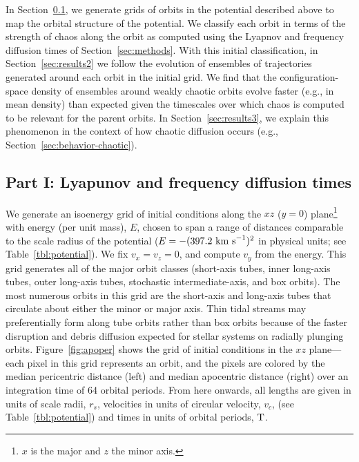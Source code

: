 In Section~\ref{sec:results1}, we generate grids of orbits in the potential described above to map the orbital structure of the potential. We classify each orbit in terms of the strength of chaos along the orbit as computed using the Lyapnov and frequency diffusion times of Section~\ref{sec:methods}. With this initial classification, in Section~\ref{sec:results2} we follow the evolution of ensembles of trajectories generated around each orbit in the initial grid. We find that the configuration-space density of ensembles around weakly chaotic orbits evolve faster (e.g., in mean density) than expected given the timescales over which chaos is computed to be relevant for the parent orbits. In Section~\ref{sec:results3}, we explain this phenomenon in the context of how chaotic diffusion occurs (e.g., Section~\ref{sec:behavior-chaotic}).

\subsection{Part I: Lyapunov and frequency diffusion times}\label{sec:results1}

We generate an isoenergy grid of initial conditions along the $xz$ ($y=0$) plane\footnote{$x$ is the major and $z$ the minor axis.} with energy (per unit mass), $E$, chosen to span a range of distances comparable to the scale radius of the potential ($E=-(397.2~{\rm km~s}^{-1})^2$ in physical units; see Table~\ref{tbl:potential}). We fix $v_x = v_z = 0$, and compute $v_y$ from the energy. This grid generates all of the major orbit classes (short-axis tubes, inner long-axis tubes, outer long-axis tubes, stochastic intermediate-axis, and box orbits). The most numerous orbits in this grid are the short-axis and long-axis tubes that circulate about either the minor or major axis. Thin tidal streams may preferentially form along tube orbits rather than box orbits because of the faster disruption and debris diffusion expected for stellar systems on radially plunging orbits. Figure~\ref{fig:apoper} shows the grid of initial conditions in the $xz$ plane---each pixel in this grid represents an orbit, and the pixels are colored by the median pericentric distance (left) and median apocentric distance (right) over an integration time of 64 orbital periods. From here onwards, all lengths are given in units of scale radii, $r_s$, velocities in units of circular velocity, $v_c$, (see Table~\ref{tbl:potential}) and times in units of orbital periods, ${\rm T}$.

